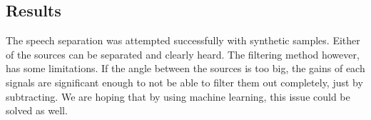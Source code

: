 \subsection*{Results} 
The speech separation was attempted successfully with synthetic samples. Either of 
the sources can be separated and clearly heard. The filtering method however, has 
some limitations. If the angle between the sources is too big, the gains of each 
signals are significant enough to not be able to filter them out completely, just 
by subtracting. We are hoping that by using machine learning, this issue could be 
solved as well.